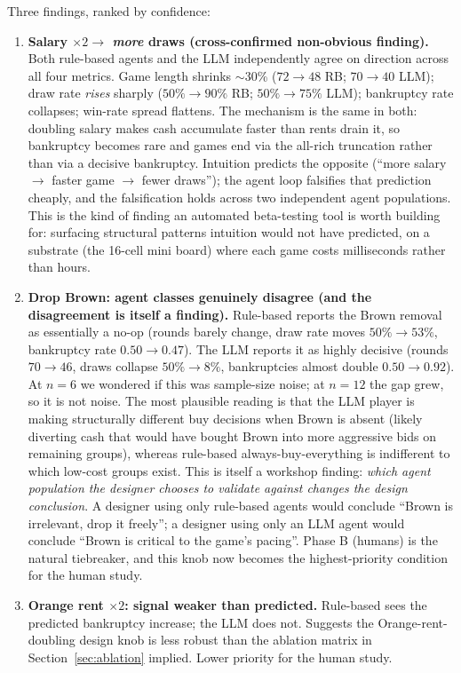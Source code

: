 \documentclass[10pt]{article}
\begin{document}
Three findings, ranked by confidence:

\begin{enumerate}[leftmargin=1.2em,itemsep=2pt]

\item \textbf{Salary $\times 2 \to$ \emph{more} draws (cross-confirmed
non-obvious finding).} Both rule-based agents and the LLM independently
agree on direction across all four metrics. Game length shrinks $\sim$30\%
(\(72 \to 48\) RB; \(70 \to 40\) LLM); draw rate \emph{rises} sharply
(\(50\% \to 90\%\) RB; \(50\% \to 75\%\) LLM); bankruptcy rate collapses;
win-rate spread flattens. The mechanism is the same in both: doubling
salary makes cash accumulate faster than rents drain it, so bankruptcy
becomes rare and games end via the all-rich truncation rather than via a
decisive bankruptcy. Intuition predicts the opposite (``more salary
$\to$ faster game $\to$ fewer draws''); the agent loop falsifies that
prediction cheaply, and the falsification holds across two independent
agent populations. This is the kind of finding an automated
beta-testing tool is worth building for: surfacing structural patterns
intuition would not have predicted, on a substrate (the 16-cell mini
board) where each game costs milliseconds rather than hours.

\item \textbf{Drop Brown: agent classes genuinely disagree (and the
disagreement is itself a finding).} Rule-based reports the Brown
removal as essentially a no-op (rounds barely change, draw rate moves
\(50\% \to 53\%\), bankruptcy rate \(0.50 \to 0.47\)). The LLM reports it
as highly decisive (rounds \(70 \to 46\), draws collapse \(50\% \to 8\%\),
bankruptcies almost double \(0.50 \to 0.92\)). At \(n=6\) we wondered if
this was sample-size noise; at \(n=12\) the gap grew, so it is not
noise. The most plausible reading is that the LLM player is making
structurally different buy decisions when Brown is absent (likely
diverting cash that would have bought Brown into more aggressive bids
on remaining groups), whereas rule-based always-buy-everything is
indifferent to which low-cost groups exist. This is itself a workshop
finding: \emph{which agent population the designer chooses to validate
against changes the design conclusion}. A designer using only
rule-based agents would conclude ``Brown is irrelevant, drop it
freely''; a designer using only an LLM agent would conclude ``Brown is
critical to the game's pacing''. Phase B (humans) is the natural
tiebreaker, and this knob now becomes the highest-priority condition
for the human study.

\item \textbf{Orange rent $\times 2$: signal weaker than predicted.}
Rule-based sees the predicted bankruptcy increase; the LLM does not.
Suggests the Orange-rent-doubling design knob is less robust than the
ablation matrix in Section~\ref{sec:ablation} implied. Lower priority
for the human study.

\end{enumerate}
\end{document}
